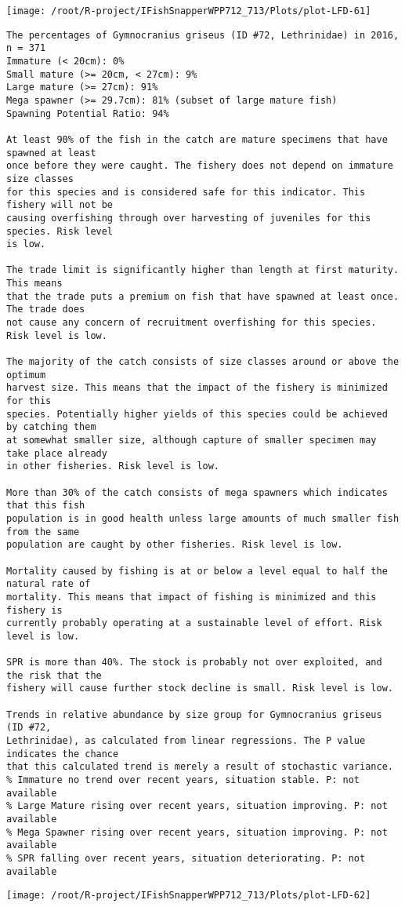 \documentclass{report}\usepackage[]{graphicx}\usepackage[]{color}
\makeatletter
\def\maxwidth{ %
  \ifdim\Gin@nat@width>\linewidth
    \linewidth
  \else
    \Gin@nat@width
  \fi
}
\newenvironment{kframe}{%
 \def\at@end@of@kframe{}%
 \ifinner\ifhmode%
  \def\at@end@of@kframe{\end{minipage}}%
  \begin{minipage}{\columnwidth}%
 \fi\fi%
 \def\FrameCommand##1{\hskip\@totalleftmargin \hskip-\fboxsep
 \colorbox{shadecolor}{##1}\hskip-\fboxsep
     \hskip-\linewidth \hskip-\@totalleftmargin \hskip\columnwidth}%
 \MakeFramed {\advance\hsize-\width
   \@totalleftmargin\z@ \linewidth\hsize
   \@setminipage}}%
 {\par\unskip\endMakeFramed%
 \at@end@of@kframe}
\newenvironment{knitrout}{}{} %
\makeatother
\begin{document}
\begin{knitrout}
\texttt{[image: /root/R-project/IFishSnapperWPP712\_713/Plots/plot-LFD-61]} 
\begin{kframe}\begin{verbatim}
The percentages of Gymnocranius griseus (ID #72, Lethrinidae) in 2016, n = 371
Immature (< 20cm): 0%
Small mature (>= 20cm, < 27cm): 9%
Large mature (>= 27cm): 91%
Mega spawner (>= 29.7cm): 81% (subset of large mature fish)
Spawning Potential Ratio: 94%
 
At least 90% of the fish in the catch are mature specimens that have spawned at least
once before they were caught. The fishery does not depend on immature size classes
for this species and is considered safe for this indicator. This fishery will not be
causing overfishing through over harvesting of juveniles for this species. Risk level
is low.

The trade limit is significantly higher than length at first maturity.  This means
that the trade puts a premium on fish that have spawned at least once. The trade does
not cause any concern of recruitment overfishing for this species. Risk level is low.

The majority of the catch consists of size classes around or above the optimum
harvest size. This means that the impact of the fishery is minimized for this
species. Potentially higher yields of this species could be achieved by catching them
at somewhat smaller size, although capture of smaller specimen may take place already
in other fisheries. Risk level is low.

More than 30% of the catch consists of mega spawners which indicates that this fish
population is in good health unless large amounts of much smaller fish from the same
population are caught by other fisheries. Risk level is low.
 
Mortality caused by fishing is at or below a level equal to half the natural rate of
mortality. This means that impact of fishing is minimized and this fishery is
currently probably operating at a sustainable level of effort. Risk level is low.
 
SPR is more than 40%. The stock is probably not over exploited, and the risk that the
fishery will cause further stock decline is small. Risk level is low.
 
Trends in relative abundance by size group for Gymnocranius griseus (ID #72,
Lethrinidae), as calculated from linear regressions. The P value indicates the chance
that this calculated trend is merely a result of stochastic variance.
% Immature no trend over recent years, situation stable. P: not available
% Large Mature rising over recent years, situation improving. P: not available
% Mega Spawner rising over recent years, situation improving. P: not available
% SPR falling over recent years, situation deteriorating. P: not available
\end{verbatim}
\end{kframe}
\texttt{[image: /root/R-project/IFishSnapperWPP712\_713/Plots/plot-LFD-62]} 


\end{knitrout}
\end{document}
